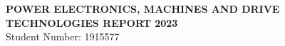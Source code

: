 \begin{center}
    \large
    \textbf{POWER ELECTRONICS, MACHINES AND DRIVE TECHNOLOGIES REPORT 2023}\\
    \vspace{2mm}
    Student Number: 1915577
\end{center}